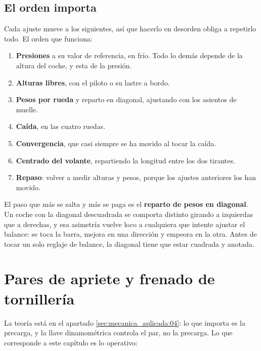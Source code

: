 \subsection{El orden importa}

Cada ajuste mueve a los siguientes, así que hacerlo en desorden obliga a
repetirlo todo. El orden que funciona:

\begin{enumerate}
  \item \textbf{Presiones} a su valor de referencia, en frío. Todo lo demás
        depende de la altura del coche, y esta de la presión.
  \item \textbf{Alturas libres}, con el piloto o su lastre a bordo.
  \item \textbf{Pesos por rueda} y reparto en diagonal, ajustando con los
        asientos de muelle.
  \item \textbf{Caída}, en las cuatro ruedas.
  \item \textbf{Convergencia}, que casi siempre se ha movido al tocar la caída.
  \item \textbf{Centrado del volante}, repartiendo la longitud entre los dos
        tirantes.
  \item \textbf{Repaso}: volver a medir alturas y pesos, porque los ajustes
        anteriores los han movido.
\end{enumerate}

\begin{clave}
El paso que más se salta y más se paga es el \textbf{reparto de pesos en
diagonal}. Un coche con la diagonal descuadrada se comporta distinto girando a
izquierdas que a derechas, y esa asimetría vuelve loco a cualquiera que intente
ajustar el balance: se toca la barra, mejora en una dirección y empeora en la
otra. Antes de tocar un solo reglaje de balance, la diagonal tiene que estar
cuadrada y anotada.
\end{clave}

\section{Pares de apriete y frenado de tornillería}
\label{sec:montaje_alineacion:03}

La teoría está en el apartado \ref{sec:mecanica_aplicada:04}: lo que importa es
la precarga, y la llave dinamométrica controla el par, no la precarga. Lo que
corresponde a este capítulo es lo operativo:


